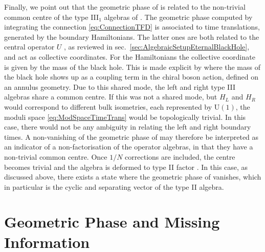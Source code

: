 \documentclass[a4paper,11pt]{article}
\newcommand{\U}{\text{U}}
\newcommand{\1}{\mathds{1}}
\begin{document}
Finally, we point out that the geometric phase of \cite{Nogueira:2021ngh} is related to the non-trivial common centre of the type III$_1$ algebras of \cite{Leutheusser:2021frk,Leutheusser:2021qhd}. The geometric phase computed by integrating the connection \eqref{eq:ConnectionTFD} is associated to time translations, generated by the boundary Hamiltonians. The latter ones are both related to the central operator $U$ \cite{Leutheusser:2021frk,Leutheusser:2021qhd}, as reviewed in sec.~\ref{sec:AlgebraicSetupEternalBlackHole}, and act as collective coordinates. For the Hamiltonians the collective coordinate is given by the mass of the black hole. This is made explicit by \cite{Henneaux:2019sjx,Banerjee:2022jnv} where the mass of the black hole shows up as a coupling term in the chiral boson action, defined on an annulus geometry. Due to this shared mode, the left and right type III algebras share a common centre. If this was not a shared mode, but $H_L$ and $H_R$ would correspond to different bulk isometries, each represented by $\U(1)$, the moduli space \eqref{eq:ModSpaceTimeTrans} would be topologically trivial. In this case, there would not be any ambiguity in relating the left and right boundary times. A non-vanishing of the geometric phase of \cite{Nogueira:2021ngh} may therefore be interpreted as an indicator of a non-factorisation of the operator algebras, in that they have a non-trivial common centre. Once $1/N$ corrections are included, the centre becomes trivial and the algebra is deformed to type II factor \cite{Witten:2021unn}. In this case, as discussed above, there exists a state where the geometric phase of \cite{Nogueira:2021ngh} vanishes, which in particular is the cyclic and separating vector of the type II algebra.

\section{Geometric Phase and Missing Information}
\label{sec:GeometricPhaseAndMissingInformation}
\end{document}
